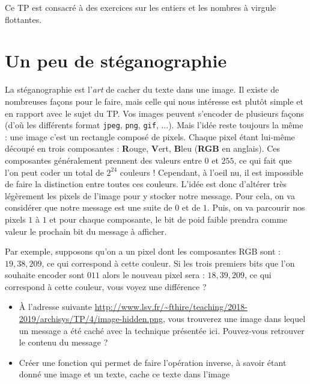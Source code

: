 \documentclass[11pt]{article}
\newcommand{\numtd}{04}
\newcommand{\titretd}{Entiers et virgule flottante}
\begin{document}
\entete{\numtd}{\titretd}

\begin{introduction}
Ce TP est consacré à des exercices sur les entiers et les nombres à virgule
flottantes.
\end{introduction}

\section{Un peu de stéganographie}

La stéganographie est l'\textit{art} de cacher du texte dans une image. Il existe de nombreuses façons pour le faire, mais celle qui nous intéresse est plutôt simple et en rapport avec le sujet du TP. Vos images peuvent s'encoder de plusieurs façons (d'où les différents format \texttt{jpeg}, \texttt{png}, \texttt{gif}, ...). Mais l'idée reste toujours la même : une image c'est un rectangle composé de pixels. Chaque pixel étant lui-même découpé en trois composantes : \textbf{R}ouge, \textbf{V}ert, \textbf{B}leu (\textbf{RGB} en anglais). Ces composantes généralement prennent des valeurs entre \(0\) et \(255\), ce qui fait que l'on peut coder un total de \(2^{24}\) couleurs ! Cependant, à l'oeil nu, il est impossible de faire la distinction entre toutes ces couleurs. L'idée est donc d'altérer très légèrement les pixels de l'image pour y stocker notre message. Pour cela, on va considérer que notre message est une suite de \(0\) et de \(1\). Puis, on va parcourir nos pixels \(1\) à \(1\) et pour chaque composante, le bit de poid faible prendra comme valeur le prochain bit du message à afficher.

Par exemple, supposons qu'on a un pixel dont les composantes RGB sont : \(19,38,209\), ce qui correspond à cette \textcolor{myblue}{couleur}. Si les trois premiers bits que l'on souhaite encoder sont \(011\) alors le nouveau pixel sera : \(18,39,209\), ce qui correspond à cette \textcolor{mybluebis}{couleur}, vous voyez une différence ?

\begin{itemize}
\item À l'adresse suivante \url{http://www.lsv.fr/~fthire/teaching/2018-2019/archisys/TP/4/image-hidden.png}, vous trouverez une image dans lequel un message a été caché avec la technique présentée ici. Pouvez-vous retrouver le contenu du message ?
\item Créer une fonction qui permet de faire l'opération inverse, à savoir étant donné une image et un texte, cache ce texte dans l'image
\end{itemize}
\end{document}
